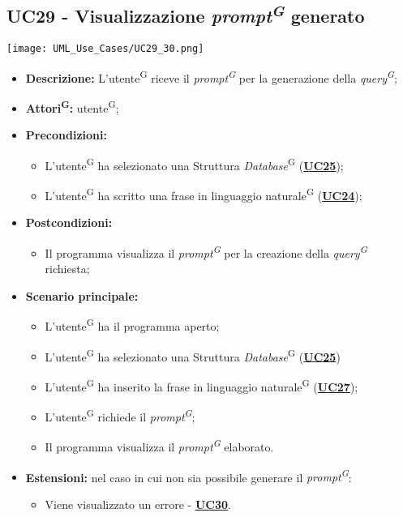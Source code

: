 \subsection{UC29 - Visualizzazione \textit{prompt\textsuperscript{G}} generato}
\label{sec:UC29}
\texttt{[image: UML\_Use\_Cases/UC29\_30.png]}
\begin{itemize}
	\item \textbf{Descrizione:} L’utente\textsuperscript{G} riceve il \textit{prompt\textsuperscript{G}} per la generazione della \textit{query\textsuperscript{G}};
	\item \textbf{Attori\textsuperscript{G}:} utente\textsuperscript{G};
	\item \textbf{Precondizioni:} 
	\begin{itemize}
		\item L’utente\textsuperscript{G} ha selezionato una Struttura \textit{Database}\textsuperscript{G} (\hyperref[sec:UC25]{\textbf{UC25}});
		\item L’utente\textsuperscript{G} ha scritto una frase in linguaggio naturale\textsuperscript{G} (\hyperref[sec:UC27]{\textbf{UC24}});
	\end{itemize}
	\item \textbf{Postcondizioni:} 
	\begin{itemize}
		\item Il programma visualizza il \textit{prompt\textsuperscript{G}} per la creazione della \textit{query\textsuperscript{G}} richiesta;
	\end{itemize}
	\item \textbf{Scenario principale:} 
	\begin{itemize}
		\item L’utente\textsuperscript{G} ha il programma aperto;
		\item L’utente\textsuperscript{G} ha selezionato una Struttura \textit{Database}\textsuperscript{G} (\hyperref[sec:UC25]{\textbf{UC25}})
		\item L'utente\textsuperscript{G} ha inserito la frase in linguaggio naturale\textsuperscript{G} (\hyperref[sec:UC27]{\textbf{UC27}});
		\item L’utente\textsuperscript{G} richiede il \textit{prompt\textsuperscript{G}};
		\item Il programma visualizza il \textit{prompt\textsuperscript{G}} elaborato.
	\end{itemize}
	\item \textbf{Estensioni:} nel caso in cui non sia possibile generare il \textit{prompt\textsuperscript{G}}:
	\begin{itemize}
		\item Viene visualizzato un errore - \hyperref[sec:UC30]{\textbf{UC30}}.
	\end{itemize}
\end{itemize}

